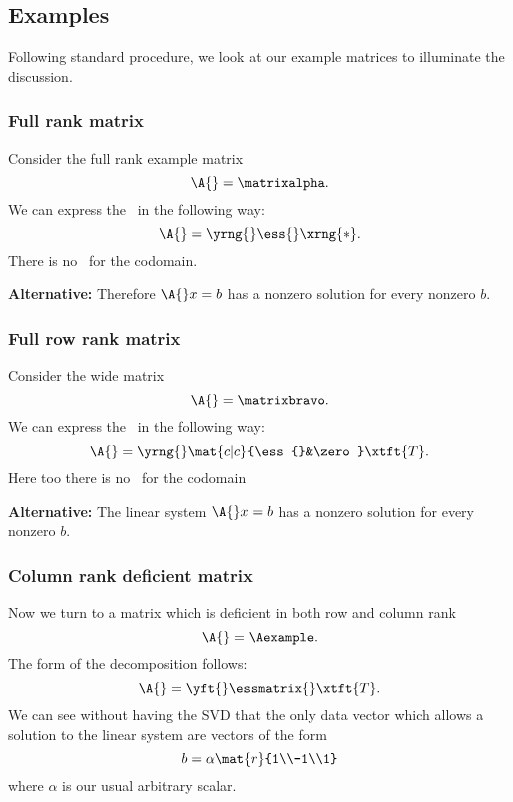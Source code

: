 \subsection{Examples}
Following standard procedure, we look at our example matrices to illuminate the discussion.

\subsubsection{Full rank matrix}
Consider the full rank example matrix
\begin{equation}
  \A{} = \matrixalpha.
\end{equation}
We can express the \svdl\ in the following way:
\begin{equation}
  \A{} = \yrng{} \ess{} \xrng{*}.
\end{equation}
There is no \ns\ for the codomain. 

\textbf{Alternative:} Therefore $\A{}x=b$ has a nonzero solution for every nonzero $b$.

\subsubsection{Full row rank matrix}
Consider the wide matrix
\begin{equation}
  \A{} = \matrixbravo.
\end{equation}
We can express the \svdl\ in the following way:
\begin{equation}
  \A{} = \yrng{} \mat{c|c}{\ess{}&\zero} \xtft{T}.
\end{equation}
Here too there is no \ns\ for the codomain 

\textbf{Alternative:} The linear system $\A{}x=b$ has a nonzero solution for every nonzero $b$.

\subsubsection{Column rank deficient matrix}
Now we turn to a matrix which is deficient in both row and column rank
\begin{equation}
  \A{} = \Aexample.
\end{equation}
The form of the decomposition follows:
\begin{equation}
  \A{} = \yft{} \essmatrix{} \xtft{T}.
\end{equation}
We can see without having the SVD that the only data vector which allows a solution to the linear system are vectors of the form
\begin{equation}
  b = \alpha \mat{r}{1\\-1\\1}
  \label{eq:16:Fredholm}
\end{equation}
where $\alpha$ is our usual arbitrary scalar.\\

